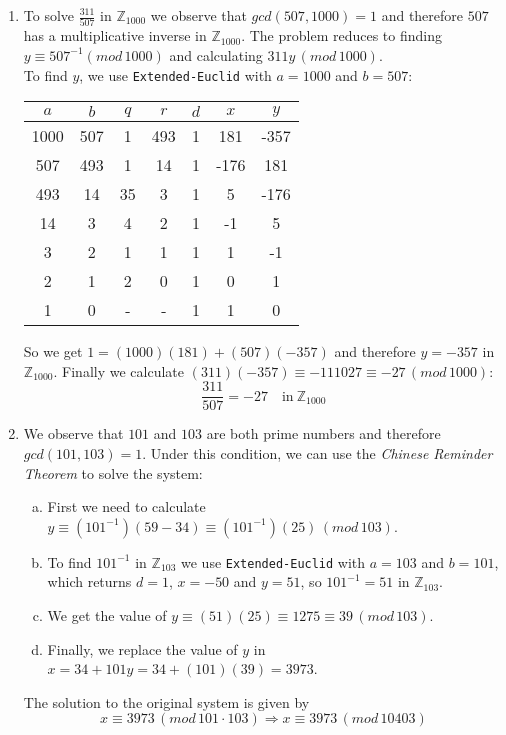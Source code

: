 \documentclass{article}
\begin{document}
\begin{enumerate}[1.]
    \item To solve $\frac{311}{507}$ in $\mathbb{Z}_{1000}$ we observe that $gcd(507, 1000) = 1$ and therefore $507$ has a multiplicative inverse in $\mathbb{Z}_{1000}$. The problem reduces to finding $y \equiv 507^{-1} (mod\,1000)$ and calculating $311y\,(mod\,1000)$.\\
    To find $y$, we use \texttt{Extended-Euclid} with $a = 1000$ and $b = 507$:
	\begin{table}[ht]
		\centering
		\begin{tabular}{ccccccc}
			\toprule
			$a$ & $b$ & $q$ & $r$ & $d$ & $x$ & $y$ \\
			\midrule
			1000 & 507 & 1 & 493 & 1 & 181 & -357 \\
			507 & 493 & 1 & 14 & 1 & -176 & 181 \\
			493 & 14 & 35 & 3 & 1 & 5 & -176 \\
            14 & 3 & 4 & 2 & 1 & -1 & 5 \\
            3 & 2 & 1 & 1 & 1 & 1 & -1 \\
            2 & 1 & 2 & 0 & 1 & 0 & 1 \\
            1 & 0 & - & - & 1 & 1 & 0 \\
			\bottomrule
		\end{tabular}
    \end{table}
    \newpage
    So we get $1 = (1000)(181) + (507)(-357)$ and therefore $y = -357$ in $\mathbb{Z}_{1000}$. Finally we calculate $(311)(-357) \equiv -111027 \equiv -27\,(mod\,1000)$:
    \begin{equation*}
        \frac{311}{507} = -27 \quad \text{in} \ \mathbb{Z}_{1000}
    \end{equation*}
    
    \item We observe that $101$ and $103$ are both prime numbers and therefore $gcd(101, 103) = 1$. Under this condition, we can use the \emph{Chinese Reminder Theorem} to solve the system:
    \begin{enumerate}[(a)]
        \item First we need to calculate $y \equiv (101^{-1})(59 - 34) \equiv (101^{-1})(25)\,(mod\,103)$.
        \item To find $101^{-1}$ in $\mathbb{Z}_{103}$ we use \texttt{Extended-Euclid} with $a = 103$ and $b = 101$, which returns $d = 1$, $x = -50$ and $y = 51$, so $101^{-1} = 51$ in $\mathbb{Z}_{103}$.
        \item We get the value of $y \equiv (51)(25) \equiv 1275 \equiv 39\,(mod\,103)$.
        \item Finally, we replace the value of $y$ in $x = 34 + 101y = 34 + (101)(39) = 3973$.
    \end{enumerate}
    The solution to the original system is given by
    \begin{equation*}
        x \equiv 3973 \, (mod \, 101 \cdot 103) \Rightarrow x \equiv 3973 \, (mod \, 10403)
    \end{equation*}
    

\end{enumerate}
\end{document}
